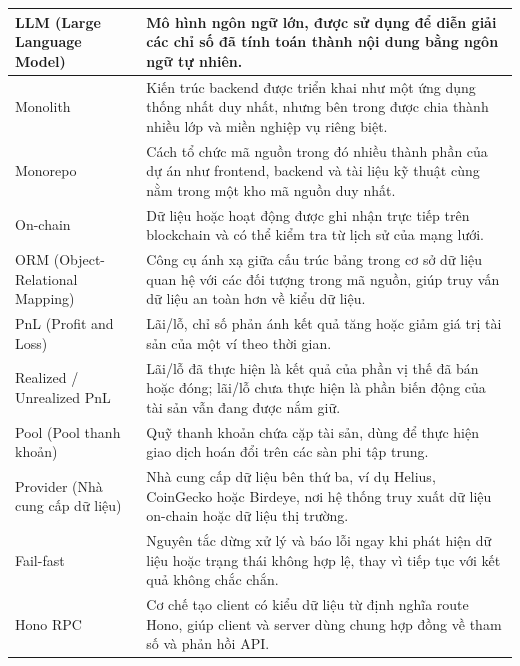\begin{longtable}{|L{3.8cm}|L{11.2cm}|}
LLM (Large Language Model) & Mô hình ngôn ngữ lớn, được sử dụng để diễn giải các chỉ số đã tính toán thành nội dung bằng ngôn ngữ tự nhiên. \\
\hline

Monolith & Kiến trúc backend được triển khai như một ứng dụng thống nhất duy nhất, nhưng bên trong được chia thành nhiều lớp và miền nghiệp vụ riêng biệt. \\
\hline

Monorepo & Cách tổ chức mã nguồn trong đó nhiều thành phần của dự án như frontend, backend và tài liệu kỹ thuật cùng nằm trong một kho mã nguồn duy nhất. \\
\hline

On-chain & Dữ liệu hoặc hoạt động được ghi nhận trực tiếp trên blockchain và có thể kiểm tra từ lịch sử của mạng lưới. \\
\hline

ORM (Object-Relational Mapping) & Công cụ ánh xạ giữa cấu trúc bảng trong cơ sở dữ liệu quan hệ với các đối tượng trong mã nguồn, giúp truy vấn dữ liệu an toàn hơn về kiểu dữ liệu. \\
\hline

PnL (Profit and Loss) & Lãi/lỗ, chỉ số phản ánh kết quả tăng hoặc giảm giá trị tài sản của một ví theo thời gian. \\
\hline

Realized / Unrealized PnL & Lãi/lỗ đã thực hiện là kết quả của phần vị thế đã bán hoặc đóng; lãi/lỗ chưa thực hiện là phần biến động của tài sản vẫn đang được nắm giữ. \\
\hline

Pool (Pool thanh khoản) & Quỹ thanh khoản chứa cặp tài sản, dùng để thực hiện giao dịch hoán đổi trên các sàn phi tập trung. \\
\hline

Provider (Nhà cung cấp dữ liệu) & Nhà cung cấp dữ liệu bên thứ ba, ví dụ Helius, CoinGecko hoặc Birdeye, nơi hệ thống truy xuất dữ liệu on-chain hoặc dữ liệu thị trường. \\
\hline

Fail-fast & Nguyên tắc dừng xử lý và báo lỗi ngay khi phát hiện dữ liệu hoặc trạng thái không hợp lệ, thay vì tiếp tục với kết quả không chắc chắn. \\
\hline

Hono RPC & Cơ chế tạo client có kiểu dữ liệu từ định nghĩa route Hono, giúp client và server dùng chung hợp đồng về tham số và phản hồi API. \\
\hline


\end{longtable}
